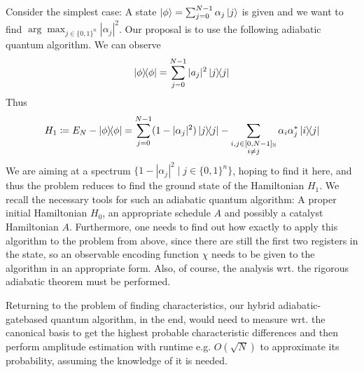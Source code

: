 \documentclass[10pt]{amsart}
\theoremstyle{definition}
\theoremstyle{remark}
\begin{document}
    Consider the simplest case: A state \(\ket{\phi} = \sum_{j = 0}^{N-1} \alpha_j \ket{j}\) is given and we want to find \(\arg\max_{j \in \{0, 1\}^n} |\alpha_j|^2\). Our proposal is to use the following adiabatic quantum algorithm. We can observe
    \begin{align}
        \ketbra{\phi}{\phi} = \sum_{j=0}^{N-1} |a_j|^2 \ketbra{j}{j}
    \end{align}
    Thus
    \begin{align}
        H_1 \coloneqq E_N-\ketbra{\phi}{\phi} = \sum_{j=0}^{N-1} (1-|\alpha_j|^2) \ketbra{j}{j} - \sum_{\substack{i, j \in [0, N-1]_{\mathbb{N}}\\i \neq j}} \alpha_i\alpha_j^*\ketbra*{i}{j}
    \end{align}
    We are aiming at a spectrum \(\{1 - |\alpha_j|^2 \mid j \in \{0, 1\}^n\}\), hoping to find it here, and thus the problem reduces to find the ground state of the Hamiltonian \(H_1\). We recall the necessary tools for such an adiabatic quantum algorithm: A proper initial Hamiltonian \(H_0\), an appropriate schedule \(A\) and possibly a catalyst Hamiltonian \(A\). Furthermore, one needs to find out how exactly to apply this algorithm to the problem from above, since there are still the first two registers in the state, so an observable encoding function \(\chi\) needs to be given to the algorithm in an appropriate form. Also, of course, the analysis wrt. the rigorous adiabatic theorem must be performed.

    Returning to the problem of finding characteristics, our hybrid adiabatic-gatebased quantum algorithm, in the end, would need to measure wrt. the canonical basis to get the highest probable characteristic differences and then perform amplitude estimation with runtime e.g. \(O(\sqrt{N})\) \cite[pp. 19-20]{Brassard} to approximate its probability, assuming the knowledge of it is needed.
\end{document}
